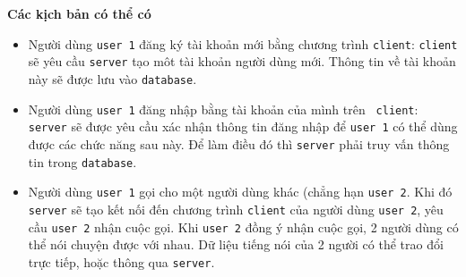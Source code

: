     \textbf{Các kịch bản có thể có}
    \begin{itemize}
        \item Người dùng \texttt{user 1} đăng ký tài khoản mới bằng chương
            trình \texttt{client}: \texttt{client} sẽ yêu cầu \texttt{server}
            tạo môt tài khoản người dùng mới. Thông tin về tài khoản này sẽ
            được lưu vào \texttt{database}.
        \item Người dùng \texttt{user 1} đăng nhập bằng tài khoản của mình trên
            \texttt{ client}: \texttt{server} sẽ được yêu cầu xác nhận thông
            tin đăng nhập để \texttt{user 1} có thể dùng được các chức năng sau
            này. Để làm điều đó thì \texttt{server} phải truy vấn thông tin
            trong \texttt{database}.
        \item Người dùng \texttt{user 1} gọi cho một người dùng khác (chẳng hạn
            \texttt{user 2}. Khi đó \texttt{server} sẽ tạo kết nối đến chương
            trình \texttt{client} của người dùng \texttt{user 2}, yêu cầu
            \texttt{user 2} nhận cuộc gọi. Khi \texttt{user 2} đồng ý nhận cuộc
            gọi, 2 người dùng có thể nói chuyện được với nhau. Dữ liệu tiếng
            nói của 2 người có thể trao đổi trực tiếp, hoặc thông qua
            \texttt{server}.
    \end{itemize}
